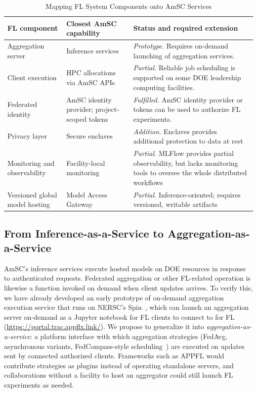 \documentclass[conference]{IEEEtran}
\begin{document}
\begin{table}[htbp]
\caption{Mapping FL System Components onto AmSC Services}
\label{tab:mapping}
\centering
\renewcommand{\arraystretch}{1.15}
\begin{tabular}{
@{}
    >{\raggedright\arraybackslash}p{3.8cm}
    >{\raggedright\arraybackslash}p{4.0cm}
    >{\raggedright\arraybackslash}p{8.2cm}@{}}
\toprule
\textbf{FL component} &
\textbf{Closest AmSC capability} &
\textbf{Status and required extension} \\
\midrule
Aggregation server &
Inference services &
\emph{Prototype.} Requires on-demand launching of aggregation services. \\
Client execution &
HPC allocations via AmSC APIs &
\emph{Partial.} Reliable job scheduling is supported on some DOE leadership computing facilities. \\
Federated identity &
AmSC identity provider; project-scoped tokens &
\emph{Fulfilled.} AmSC identity provider or tokens can be used to authorize FL experiments. \\
Privacy layer &
Secure enclaves &
\emph{Addition.} Enclaves provides additional protection to data at rest \\
Monitoring and observability &
Facility-local monitoring &
\emph{Partial.} MLFlow provides partial observability, but lacks monitoring tools to oversee the whole distributed workflows \\
Versioned global model hosting &
Model Access Gateway &
\emph{Partial.} Inference-oriented; requires versioned, writable artifacts \\
\bottomrule
\end{tabular}
\end{table}



\subsection{From Inference-as-a-Service to Aggregation-as-a-Service}
AmSC's inference services execute hosted models on DOE resources in response to authenticated requests. Federated aggregation or other FL-related operation is likewise a function invoked on demand when client updates arrives.  To verify this, we have already developed an early prototype of on-demand aggregation execution service that runs on NERSC's Spin~\cite{nersc_spin}, which can launch an aggregation server on-demand as a Jupyter notebook for FL clients to connect to for FL (\href{https://portal.trac.appflx.link/}{https://portal.trac.appflx.link/}). We propose to generalize it into \emph{aggregation-as-a-service}: a platform interface with which aggregation strategies (FedAvg, asynchronous variants, FedCompass-style scheduling~\cite{li2024fedcompass}) are executed on updates sent by connected authorized clients. Frameworks such as APPFL would contribute strategies as plugins instead of operating standalone servers, and collaborations without a facility to host an aggregator could still launch FL experiments as needed.
\end{document}
